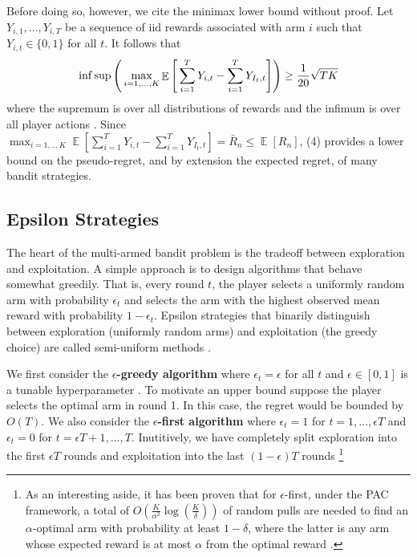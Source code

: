 \documentclass[12pt]{article}
\DeclareMathOperator*{\E}{\mathbb{E}}
\begin{document}
Before doing so, however, we cite the minimax lower bound without proof. Let $Y_{i,1},...,Y_{i,T}$ be a sequence of iid rewards associated with arm $i$ such that $Y_{i,t}\in\{0,1\}$ for all $t$. It follows that
\begin{align}
\inf\sup\Bigg{(}\max_{i=1,...,K}\E\Bigg{[}\sum_{i=1}^{T}Y_{i,t}-\sum_{i=1}^{T}Y_{I_{t},t}\Bigg{]}\Bigg{)}\geq\frac{1}{20}\sqrt{TK}
\end{align}
where the supremum is over all distributions of rewards and the infimum is over all player actions \cite{bubeck2012}. Since $\max_{i=1,..,K}\E[\sum_{i=1}^{T}Y_{i,t}-\sum_{i=1}^{T}Y_{I_{t},t}]=\bar{R}_{n}\leq\E[R_{n}]$, (4) provides a lower bound on the pseudo-regret, and by extension the expected regret, of many bandit strategies.

\subsection{Epsilon Strategies}

The heart of the multi-armed bandit problem is the tradeoff between exploration and exploitation. A simple approach is to design algorithms that behave somewhat greedily. That is, every round $t$, the player selects a uniformly random arm with probability $\epsilon_{t}$ and selects the arm with the highest observed mean reward with probability $1-\epsilon_{t}$. Epsilon strategies that binarily distinguish between exploration (uniformly random arms) and exploitation (the greedy choice) are called semi-uniform methods \cite{mohri2005}.

We first consider the \textbf{$\epsilon$-greedy algorithm} where $\epsilon_{t}=\epsilon$ for all $t$ and $\epsilon\in[0,1]$ is a tunable hyperparameter  \cite{sutton1998}. To motivate an upper bound suppose the player selects the optimal arm in round 1. In this case, the regret would be bounded by $O(T)$. We also consider the \textbf{$\epsilon$-first algorithm} where $\epsilon_{t}=1$ for $t=1,...,\epsilon T$ and $\epsilon_{t}=0$ for $t=\epsilon T+1,...,T$. Inutitively, we have completely split exploration into the first $\epsilon T$ rounds and exploitation into the last $(1-\epsilon)T$ rounds \footnote{As an interesting aside, it has been proven that for $\epsilon$-first, under the PAC framework, a total of $O\left (\frac{K}{\alpha^2} \log( \frac{K}{\delta} ) \right)$ of random pulls are needed to find an $\alpha$-optimal arm with probability at least $1-\delta$, where the latter is any arm whose expected reward is at most $\alpha$ from the optimal reward \cite{Even-Dar:2002:PBM:648301.755490}.} 
\end{document}
